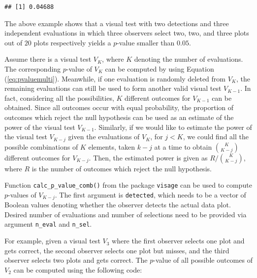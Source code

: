 \documentclass{monashthesis}
\theoremstyle{definition}
\theoremstyle{definition}
\theoremstyle{definition}
\theoremstyle{definition}
\theoremstyle{remark}
\begin{document}
\begin{Shaded}
\begin{Highlighting}[]
\NormalTok{(} \NormalTok{, } \NormalTok{, } \NormalTok{(}\NormalTok{, }\NormalTok{, }\NormalTok{), } \NormalTok{)}
\end{Highlighting}
\end{Shaded}

\begin{verbatim}
## [1] 0.04688
\end{verbatim}

The above example shows that a visual test with two detections and three independent evaluations in which three observers select two, two, and three plots out of \(20\) plots respectively yields a \(p\)-value smaller than \(0.05\).

Assume there is a visual test \(V_K\), where \(K\) denoting the number of evaluations. The corresponding \(p\)-value of \(V_K\) can be computed by using Equation (\ref{eq:pvaluemulti}). Meanwhile, if one evaluation is randomly deleted from \(V_K\), the remaining evaluations can still be used to form another valid visual test \(V_{K-1}\). In fact, considering all the possibilities, \(K\) different outcomes for \(V_{K-1}\) can be obtained. Since all outcomes occur with equal probability, the proportion of outcomes which reject the null hypothesis can be used as an estimate of the power of the visual test \(V_{K-1}\). Similarly, if we would like to estimate the power of the visual test \(V_{K-j}\) given the evaluations of \(V_{K}\), for \(j < K\), we could find all the possible combinations of \(K\) elements, taken \(k-j\) at a time to obtain \(K\choose{K-j}\) different outcomes for \(V_{K-j}\). Then, the estimated power is given as \(R/{K\choose{K-j}}\), where \(R\) is the number of outcomes which reject the null hypothesis.

Function \texttt{calc\_p\_value\_comb()} from the package \texttt{visage} can be used to compute \(p\)-values of \(V_{K-j}\). The first argument is \texttt{detected}, which needs to be a vector of Boolean values denoting whether the observer detects the actual data plot. Desired number of evaluations and number of selections need to be provided via argument \texttt{n\_eval} and \texttt{n\_sel}.

For example, given a visual test \(V_3\) where the first observer selects one plot and gets correct, the second observer selects one plot but misses, and the third observer selects two plots and gets correct. The \(p\)-value of all possible outcomes of \(V_2\) can be computed using the following code:
\end{document}
